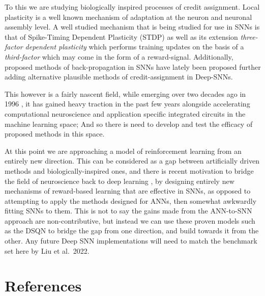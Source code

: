 \documentclass[
]{article}
\begin{document}
To this we are studying biologically inspired processes of credit
assignment. Local plasticity is a well known mechanism of adaptation at
the neuron and neuronal assembly level. A well studied mechanism that is
being studied for use in SNNs is that of Spike-Timing Dependent
Plasticity (STDP) as well as its extension \emph{three-factor dependent
plasticity} which performs training updates on the basis of a
\emph{third-factor} which may come in the form of a reward-signal.
Additionally, proposed methods of back-propagation in SNNs have lately
been proposed \autocite{payeurBurstdependentSynapticPlasticity2021}
\autocite{williamsNeuralBurstCodes2021} further adding alternative
plausible methods of credit-assignment in Deep-SNNs.

This however is a fairly nascent field, while emerging over two decades
ago in 1996 \autocite{maassNetworksSpikingNeurons1997}, it has gained
heavy traction in the past few years
\autocite{princeCurrentStateFuture2022}
\autocite{mehonicBraininspiredComputingNeeds2022} alongside
accelerating computational neuroscience and application specific
integrated circuits in the machine learning space; And so there is need
to develop and test the efficacy of proposed methods in this space.

At this point we are approaching a model of reinforcement learning from
an entirely new direction. This can be considered as a gap between
artificially driven methods and biologically-inspired ones, and there is
recent motivation to bridge the field of neuroscience back to deep
learning \autocite{zenkeVisualizingJointFuture2021} , by designing
entirely new mechanisms of reward-based learning that are effective in
SNNs, as opposed to attempting to apply the methods designed for ANNs,
then somewhat awkwardly fitting SNNs to them. This is not to say the
gains made from the ANN-to-SNN approach are non-contributive, but
instead we can use these proven models such as the DSQN to bridge the
gap from one direction, and build towards it from the other. Any future
Deep SNN implementations will need to match the benchmark set here by
Liu et al.~2022.

\hypertarget{references}{%
\section{References}\label{references}}

\autocite{chenDeepReinforcementLearning2022}

\autocite{mnihHumanlevelControlDeep2015}
\end{document}
